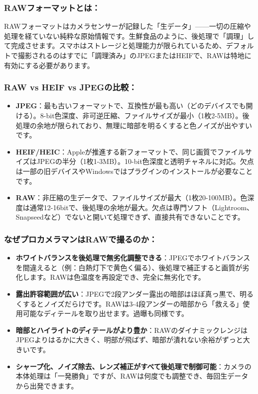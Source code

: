 
\subsubsection*{RAWフォーマットとは：}

RAWフォーマットはカメラセンサーが記録した「生データ」——一切の圧縮や処理を経ていない純粋な原始情報です。生鮮食品のように、後処理で「調理」して完成させます。スマホはストレージと処理能力が限られているため、デフォルトで撮影されるのはすでに「調理済み」のJPEGまたはHEIFで、RAWは特地に有効にする必要があります。

\subsubsection*{RAW vs HEIF vs JPEGの比較：}

\begin{itemize}
  \item \textbf{JPEG}：最も古いフォーマットで、互換性が最も高い（どのデバイスでも開ける）。8-bit色深度、非可逆圧縮、ファイルサイズが最小（1枚2-5MB）。後処理の余地が限られており、無理に暗部を明るくすると色ノイズが出やすいです。
  \item \textbf{HEIF/HEIC}：Appleが推進する新フォーマットで、同じ画質でファイルサイズはJPEGの半分（1枚1-3MB）。10-bit色深度と透明チャネルに対応。欠点は一部の旧デバイスやWindowsではプラグインのインストールが必要なことです。
  \item \textbf{RAW}：非圧縮の生データで、ファイルサイズが最大（1枚20-100MB）。色深度は通常12-16bitで、後処理の余地が最大。欠点は専門ソフト（Lightroom、Snapseedなど）でないと開いて処理できず、直接共有できないことです。
\end{itemize}

\subsubsection*{なぜプロカメラマンはRAWで撮るのか：}

\begin{itemize}
  \item \textbf{ホワイトバランスを後処理で無劣化調整できる}：JPEGでホワイトバランスを間違えると（例：白熱灯下で黄色く偏る）、後処理で補正すると画質が劣化します。RAWは色温度を再設定でき、完全に無劣化です。
  \item \textbf{露出許容範囲が広い}：JPEGで2段アンダー露出の暗部はほぼ真っ黒で、明るくするとノイズだらけです。RAWは3-4段アンダーの暗部から「救える」使用可能なディテールを取り出せます。過曝も同様です。
  \item \textbf{暗部とハイライトのディテールがより豊か}：RAWのダイナミックレンジはJPEGよりはるかに大きく、明部が飛ばず、暗部が潰れない余裕がずっと大きいです。
  \item \textbf{シャープ化、ノイズ除去、レンズ補正がすべて後処理で制御可能}：カメラの本体処理は「一発勝負」ですが、RAWは何度でも調整でき、毎回生データから出発できます。
\end{itemize}

